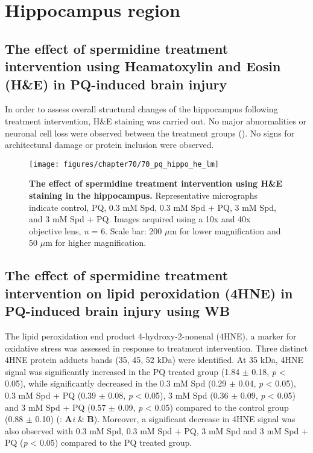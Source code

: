 \section{Hippocampus region}
\subsection{The effect of spermidine treatment intervention using Heamatoxylin and Eosin (H\&E) in PQ-induced brain injury}
In order to assess overall structural changes of the hippocampus following treatment intervention, H\&E staining was carried out. No major abnormalities or neuronal cell loss were observed between the treatment groups (). No signs for architectural damage or protein inclusion were observed.

\begin{figure}[!htbp]
\center
  \texttt{[image: figures/chapter70/70\_pq\_hippo\_he\_lm]}
  \caption[The effect of spermidine treatment intervention using H\&E staining in the hippocampus]{\textbf{The effect of spermidine treatment intervention using H\&E staining in the hippocampus.} Representative micrographs indicate control, PQ, 0.3 mM Spd, 0.3 mM Spd + PQ, 3 mM Spd, and 3 mM Spd + PQ. Images acquired using a 10x and 40x objective lens, \textit{n} = 6. Scale bar: 200 $\mu$m for lower magnification and 50 $\mu$m for higher magnification.}
  \label{fig:70_pq_hippo_he_lm}
\end{figure} 

\subsection{The effect of spermidine treatment intervention on lipid peroxidation (4HNE) in PQ-induced brain injury using WB}
The lipid peroxidation end product 4-hydroxy-2-nonenal (4HNE), a marker for oxidative stress was assessed in response to treatment intervention. Three distinct 4HNE protein adducts bands (35, 45, 52 kDa) were identified. At 35 kDa, 4HNE signal was significantly increased in the PQ treated group (1.84 $\pm$ 0.18, \textit{p} < 0.05), while significantly decreased in the 0.3 mM Spd (0.29 $\pm$ 0.04, \textit{p} < 0.05), 0.3 mM Spd + PQ (0.39 $\pm$ 0.08, \textit{p} < 0.05), 3 mM Spd (0.36 $\pm$ 0.09, \textit{p} < 0.05) and 3 mM Spd + PQ (0.57 $\pm$ 0.09, \textit{p} < 0.05) compared to the control group (0.88 $\pm$ 0.10) (: \textbf{A}\textit{i} \& \textbf{B}). Moreover, a significant decrease in 4HNE signal was also observed with 0.3 mM Spd, 0.3 mM Spd + PQ, 3 mM Spd and 3 mM Spd + PQ (\textit{p} < 0.05) compared to the PQ treated group. 

